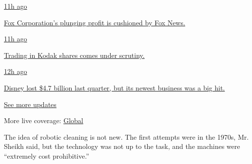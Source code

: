 \href{https://www.nytimes3xbfgragh.onion/live/2020/08/04/business/stock-market-today-coronavirus?action=click\&pgtype=Article\&state=default\&region=MAIN_CONTENT_1\&context=storylines_live_updates\#fox-corporations-plunging-profit-is-cushioned-by-fox-news}{11h
ago}

\href{https://www.nytimes3xbfgragh.onion/live/2020/08/04/business/stock-market-today-coronavirus?action=click\&pgtype=Article\&state=default\&region=MAIN_CONTENT_1\&context=storylines_live_updates\#fox-corporations-plunging-profit-is-cushioned-by-fox-news}{Fox
Corporation's plunging profit is cushioned by Fox News.}

\href{https://www.nytimes3xbfgragh.onion/live/2020/08/04/business/stock-market-today-coronavirus?action=click\&pgtype=Article\&state=default\&region=MAIN_CONTENT_1\&context=storylines_live_updates\#trading-in-kodak-shares-comes-under-scrutiny}{11h
ago}

\href{https://www.nytimes3xbfgragh.onion/live/2020/08/04/business/stock-market-today-coronavirus?action=click\&pgtype=Article\&state=default\&region=MAIN_CONTENT_1\&context=storylines_live_updates\#trading-in-kodak-shares-comes-under-scrutiny}{Trading
in Kodak shares comes under scrutiny.}

\href{https://www.nytimes3xbfgragh.onion/live/2020/08/04/business/stock-market-today-coronavirus?action=click\&pgtype=Article\&state=default\&region=MAIN_CONTENT_1\&context=storylines_live_updates\#disney-lost-4-7-billion-last-quarter-but-its-newest-business-was-a-big-hit}{12h
ago}

\href{https://www.nytimes3xbfgragh.onion/live/2020/08/04/business/stock-market-today-coronavirus?action=click\&pgtype=Article\&state=default\&region=MAIN_CONTENT_1\&context=storylines_live_updates\#disney-lost-4-7-billion-last-quarter-but-its-newest-business-was-a-big-hit}{Disney
lost \$4.7 billion last quarter, but its newest business was a big hit.}

\href{https://www.nytimes3xbfgragh.onion/live/2020/08/04/business/stock-market-today-coronavirus?action=click\&pgtype=Article\&state=default\&region=MAIN_CONTENT_1\&context=storylines_live_updates}{See
more updates}

More live coverage:
\href{https://www.nytimes3xbfgragh.onion/2020/08/04/world/coronavirus-cases.html?action=click\&pgtype=Article\&state=default\&region=MAIN_CONTENT_1\&context=storylines_live_updates}{Global}

The idea of robotic cleaning is not new. The first attempts were in the
1970s, Mr. Sheikh said, but the technology was not up to the task, and
the machines were ``extremely cost prohibitive.''

